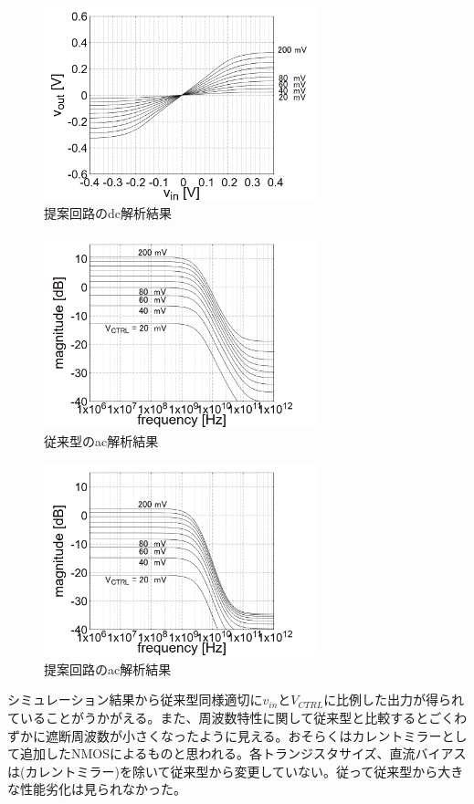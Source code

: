 \documentclass[twocolumn]{jsarticle}
\begin{document}
    \begin{figure}[h]
        \begin{center}
            \includegraphics*[width = 80mm]{figures/NtoN_dc_monochrome.PNG}
            \caption{提案回路のdc解析結果}
            \label{fig:sim_NtoN_dc}
        \end{center}
    \end{figure}
    \newpage
    \begin{figure}[h]
        \begin{center}
            \includegraphics*[width = 80mm]{figures/previous_ac_monochrome.PNG}
            \caption{従来型のac解析結果}
            \label{fig:sim_previous_ac}
        \end{center}
    \end{figure}
    \begin{figure}[h]
        \begin{center}
            \includegraphics*[width = 80mm]{figures/NtoN_ac_monochrome.PNG}
            \caption{提案回路のac解析結果}
            \label{fig:sim_NtoN_ac}
        \end{center}
    \end{figure}
    シミュレーション結果から従来型同様適切に$v_{in}$と$V_{CTRL}$に比例した出力が得られていることがうかがえる。また、周波数特性に関して従来型と比較するとごくわずかに遮断周波数が小さくなったように見える。おそらくはカレントミラーとして追加したNMOSによるものと思われる。各トランジスタサイズ、直流バイアスは(カレントミラー)を除いて従来型から変更していない。従って従来型から大きな性能劣化は見られなかった。
\end{document}
